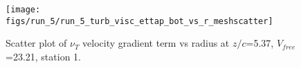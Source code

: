 \begin{figure}[H]
\centering
\texttt{[image: figs/run\_5/run\_5\_turb\_visc\_ettap\_bot\_vs\_r\_meshscatter]}
\caption{Scatter plot of $\nu_T$ velocity gradient term vs radius at $z/c$=5.37, $V_{free}$=23.21, station 1.}
\label{fig:run_5_turb_visc_ettap_bot_vs_r_meshscatter}
\end{figure}


